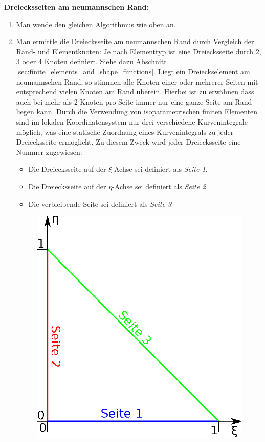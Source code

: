 \textbf{Dreiecksseiten am neumannschen Rand:}
\begin{enumerate}
	\item Man wende den gleichen Algorithmus wie oben an.
	\item Man ermittle die Dreiecksseite am neumannschen Rand durch Vergleich der Rand- und Elementknoten:\newline
	Je nach Elementtyp ist eine Dreiecksseite durch 2, 3 oder 4 Knoten definiert. Siehe dazu Abschnitt \ref{sec:finite_elements_and_shape_functions}. Liegt ein Dreieckselement am neumannschen Rand, so stimmen alle Knoten einer oder mehrerer Seiten mit entsprechend vielen Knoten am Rand überein. Hierbei ist zu erwähnen dass auch bei mehr als 2 Knoten pro Seite immer nur eine ganze Seite am Rand liegen kann. \newline
	Durch die Verwendung von isoparametrischen finiten Elementen sind im lokalen Koordinatensystem nur drei verschiedene Kurvenintegrale möglich, was eine statische Zuordnung eines Kurvenintegrals zu jeder Dreiecksseite ermöglicht. Zu diesem Zweck wird jeder Dreiecksseite eine Nummer zugewiesen:
	\begin{itemize}
		\item Die Dreiecksseite auf der $\xi$-Achse sei definiert als \textit{Seite 1}.
		\item Die Dreiecksseite auf der $\eta$-Achse sei definiert als \textit{Seite 2}.
		\item Die verbleibende Seite sei definiert als \textit{Seite 3}
	\end{itemize}
	\begin{figure}[H]
		\begin{center}
			\includegraphics[scale=0.65]{pics/triangle_side_assignment.eps}

\end{center}
\end{figure}
\end{enumerate}
